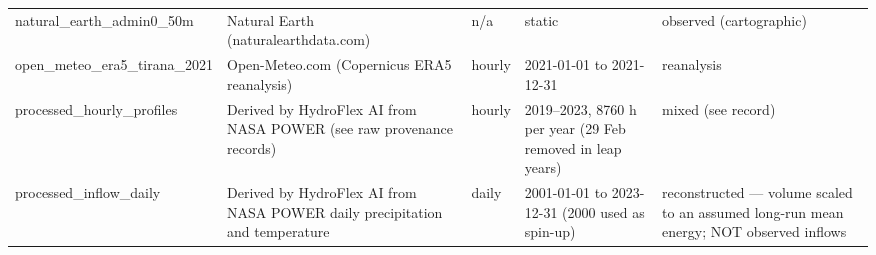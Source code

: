 \begin{table}[htbp]
\begin{adjustbox}{max width=\linewidth}
\begin{tabular}{lp{3.4cm}p{1.3cm}p{2.6cm}p{4.2cm}}
natural\_earth\_admin0\_50m & Natural Earth (naturalearthdata.com) & n/a & static & observed (cartographic) \\
open\_meteo\_era5\_tirana\_2021 & Open-Meteo.com (Copernicus ERA5 reanalysis) & hourly & 2021-01-01 to 2021-12-31 & reanalysis \\
processed\_hourly\_profiles & Derived by HydroFlex AI from NASA POWER (see raw provenance records) & hourly & 2019–2023, 8760 h per year (29 Feb removed in leap years) & mixed (see record) \\
processed\_inflow\_daily & Derived by HydroFlex AI from NASA POWER daily precipitation and temperature & daily & 2001-01-01 to 2023-12-31 (2000 used as spin-up) & reconstructed — volume scaled to an assumed long-run mean energy; NOT observed inflows \\
\bottomrule
\end{tabular}
\end{adjustbox}
\end{table}

